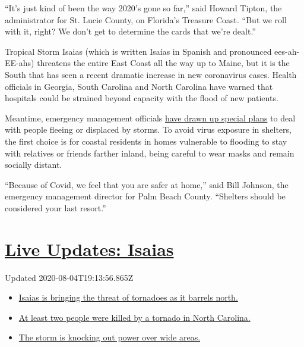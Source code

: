 ``It's just kind of been the way 2020's gone so far,'' said Howard
Tipton, the administrator for St. Lucie County, on Florida's Treasure
Coast. ``But we roll with it, right? We don't get to determine the cards
that we're dealt.''

Tropical Storm Isaias (which is written Isaías in Spanish and pronounced
ees-ah-EE-ahs) threatens the entire East Coast all the way up to Maine,
but it is the South that has seen a recent dramatic increase in new
coronavirus cases. Health officials in Georgia, South Carolina and North
Carolina have warned that hospitals could be strained beyond capacity
with the flood of new patients.

Meantime, emergency management officials
\href{https://www.nytimes3xbfgragh.onion/2020/05/24/us/hurricane-pandemic-coronavirus-florida.html}{have
drawn up special plans} to deal with people fleeing or displaced by
storms. To avoid virus exposure in shelters, the first choice is for
coastal residents in homes vulnerable to flooding to stay with relatives
or friends farther inland, being careful to wear masks and remain
socially distant.

``Because of Covid, we feel that you are safer at home,'' said Bill
Johnson, the emergency management director for Palm Beach County.
``Shelters should be considered your last resort.''

\hypertarget{live-updates-isaias}{%
\section{\texorpdfstring{\href{https://www.nytimes3xbfgragh.onion/2020/08/04/us/isaias-storm-updates.html?action=click\&pgtype=Article\&state=default\&region=MAIN_CONTENT_1\&context=storylines_live_updates}{Live
Updates: Isaias}}{Live Updates: Isaias}}\label{live-updates-isaias}}

Updated 2020-08-04T19:13:56.865Z

\begin{itemize}
\tightlist
\item
  \href{https://www.nytimes3xbfgragh.onion/2020/08/04/us/isaias-storm-updates.html?action=click\&pgtype=Article\&state=default\&region=MAIN_CONTENT_1\&context=storylines_live_updates\#link-362830dd}{Isaias
  is bringing the threat of tornadoes as it barrels north.}
\item
  \href{https://www.nytimes3xbfgragh.onion/2020/08/04/us/isaias-storm-updates.html?action=click\&pgtype=Article\&state=default\&region=MAIN_CONTENT_1\&context=storylines_live_updates\#link-7961bdbc}{At
  least two people were killed by a tornado in North Carolina.}
\item
  \href{https://www.nytimes3xbfgragh.onion/2020/08/04/us/isaias-storm-updates.html?action=click\&pgtype=Article\&state=default\&region=MAIN_CONTENT_1\&context=storylines_live_updates\#link-34e5d4e4}{The
  storm is knocking out power over wide areas.}
\end{itemize}

